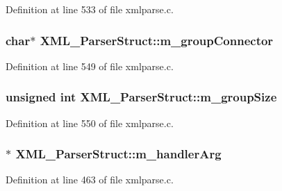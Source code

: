 Definition at line 533 of file xmlparse.\+c.

\subsubsection[{\texorpdfstring{m\+\_\+group\+Connector}{m_groupConnector}}]{\setlength{\rightskip}{0pt plus 5cm}char$\ast$ X\+M\+L\+\_\+\+Parser\+Struct\+::m\+\_\+group\+Connector}\hypertarget{struct_x_m_l___parser_struct_a3186f6c104537ac2ba89d287c5ab021d}{}\label{struct_x_m_l___parser_struct_a3186f6c104537ac2ba89d287c5ab021d}


Definition at line 549 of file xmlparse.\+c.

\subsubsection[{\texorpdfstring{m\+\_\+group\+Size}{m_groupSize}}]{\setlength{\rightskip}{0pt plus 5cm}unsigned {\bf int} X\+M\+L\+\_\+\+Parser\+Struct\+::m\+\_\+group\+Size}\hypertarget{struct_x_m_l___parser_struct_a1ab0f0c1938e9e22c11b531475eafd02}{}\label{struct_x_m_l___parser_struct_a1ab0f0c1938e9e22c11b531475eafd02}


Definition at line 550 of file xmlparse.\+c.

\subsubsection[{\texorpdfstring{m\+\_\+handler\+Arg}{m_handlerArg}}]{$\ast$ X\+M\+L\+\_\+\+Parser\+Struct\+::m\+\_\+handler\+Arg}\hypertarget{struct_x_m_l___parser_struct_afff80e1e001253c16d07998981ad0dad}{}\label{struct_x_m_l___parser_struct_afff80e1e001253c16d07998981ad0dad}


Definition at line 463 of file xmlparse.\+c.

